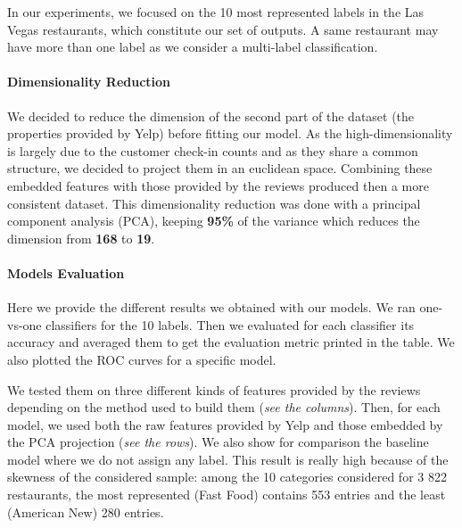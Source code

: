 \documentclass[twoside]{article}
\begin{document}
\begin{multicols}{2}
In our experiments, we focused on the 10 most represented labels in the Las Vegas restaurants, which constitute our set of outputs. A same restaurant may have more than one label as we consider a multi-label classification.

\paragraph{Dimensionality Reduction}

\noindent We decided to reduce the dimension of the second part of the dataset (the properties provided by Yelp) before fitting our model. As the high-dimensionality is largely due to the customer check-in counts and as they share a common structure, we decided to project them in an euclidean space. Combining these embedded features with those provided by the reviews produced then a more consistent dataset. This dimensionality reduction was done with a principal component analysis (PCA), keeping \textbf{95\%} of the variance which reduces the dimension from \textbf{168} to \textbf{19}.

\paragraph{Models Evaluation}

\noindent Here we provide the different results we obtained with our models. We ran one-vs-one classifiers for the 10 labels. Then we evaluated for each classifier its accuracy and averaged them to get the evaluation metric printed in the table. We also plotted the ROC curves for a specific model.

\noindent We tested them on three different kinds of features provided by the reviews depending on the method used to build them (\textit{see the columns}). Then, for each model, we used both the raw features provided by Yelp and those embedded by the PCA projection (\textit{see the rows}). We also show for comparison the baseline model where we do not assign any label. This result is really high because of the skewness of the considered sample: among the 10 categories considered for 3 822 restaurants, the most represented (Fast Food) contains 553 entries and the least (American New) 280 entries.


\end{multicols}
\end{document}
